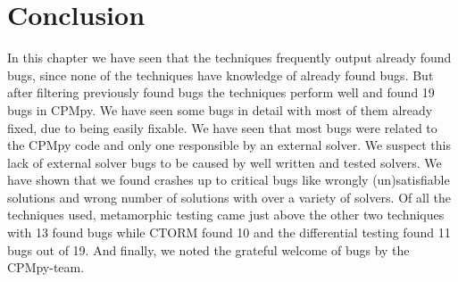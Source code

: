 


\section{Conclusion}
\label{res:conclusion}
In this chapter we have seen that the techniques frequently output already found bugs, since none of the techniques have knowledge of already found bugs. But after filtering previously found bugs the techniques perform well and found 19 bugs in CPMpy. We have seen some bugs in detail with most of them already fixed, due to being easily fixable. We have seen that most bugs were related to the CPMpy code and only one responsible by an external solver. We suspect this lack of external solver bugs to be caused by well written and tested solvers. We have shown that we found crashes up to critical bugs like wrongly (un)satisfiable solutions and wrong number of solutions with over a variety of solvers. Of all the techniques used, metamorphic testing came just above the other two techniques with 13 found bugs while CTORM found 10 and the differential testing found 11 bugs out of 19. And finally, we noted the grateful welcome of bugs by the CPMpy-team.

